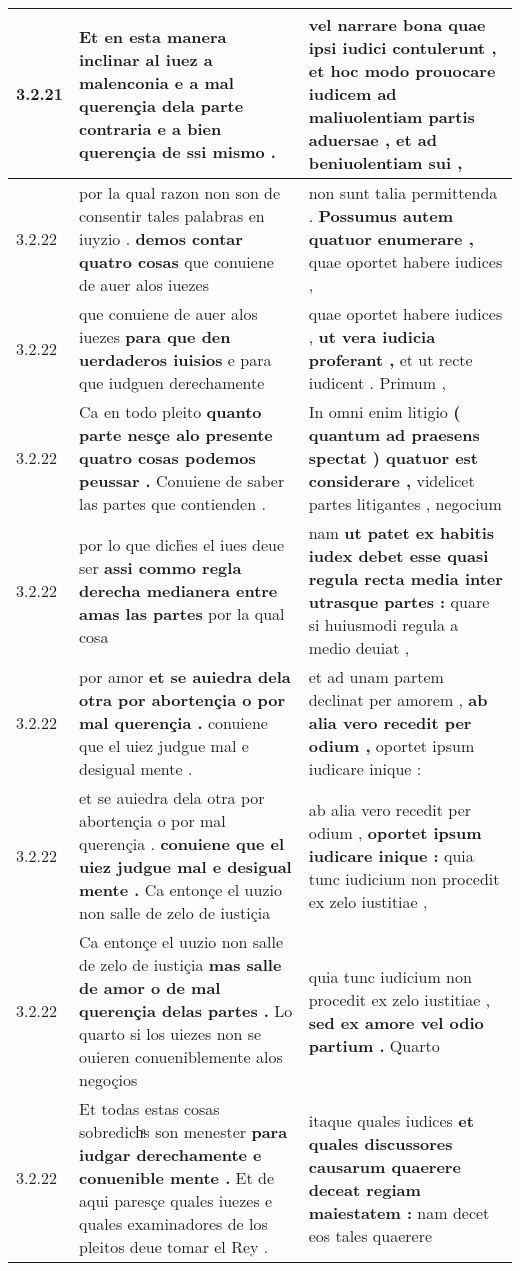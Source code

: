 \begin{tabular}{|p{1cm}|p{6.5cm}|p{6.5cm}|}
3.2.21 & Et en esta manera inclinar al iuez a malenconia \textbf{ e a mal querençia dela parte contraria } e a bien querençia de ssi mismo . & vel narrare bona quae ipsi iudici contulerunt , \textbf{ et hoc modo prouocare iudicem ad maliuolentiam partis aduersae , } et ad beniuolentiam sui , \\\hline
3.2.22 & por la qual razon non son de consentir tales palabras en iuyzio . \textbf{ demos contar quatro cosas } que conuiene de auer alos iuezes & non sunt talia permittenda . \textbf{ Possumus autem quatuor enumerare , } quae oportet habere iudices , \\\hline
3.2.22 & que conuiene de auer alos iuezes \textbf{ para que den uerdaderos iuisios } e para que iudguen derechamente & quae oportet habere iudices , \textbf{ ut vera iudicia proferant , } et ut recte iudicent . Primum , \\\hline
3.2.22 & Ca en todo pleito \textbf{ quanto parte nesçe alo presente quatro cosas podemos peussar . } Conuiene de saber las partes que contienden . & In omni enim litigio \textbf{ ( quantum ad praesens spectat ) quatuor est considerare , } videlicet partes litigantes , negocium \\\hline
3.2.22 & por lo que dich̉es el iues deue ser \textbf{ assi commo regla derecha medianera entre amas las partes } por la qual cosa & nam \textbf{ ut patet ex habitis iudex debet esse quasi regula recta media inter utrasque partes : } quare si huiusmodi regula a medio deuiat , \\\hline
3.2.22 & por amor \textbf{ et se auiedra dela otra por abortençia o por mal querençia . } conuiene que el uiez judgue mal e desigual mente . & et ad unam partem declinat per amorem , \textbf{ ab alia vero recedit per odium , } oportet ipsum iudicare inique : \\\hline
3.2.22 & et se auiedra dela otra por abortençia o por mal querençia . \textbf{ conuiene que el uiez judgue mal e desigual mente . } Ca entonçe el uuzio non salle de zelo de iustiçia & ab alia vero recedit per odium , \textbf{ oportet ipsum iudicare inique : } quia tunc iudicium non procedit ex zelo iustitiae , \\\hline
3.2.22 & Ca entonçe el uuzio non salle de zelo de iustiçia \textbf{ mas salle de amor o de mal querençia delas partes . } Lo quarto si los uiezes non se ouieren conueniblemente alos negoçios & quia tunc iudicium non procedit ex zelo iustitiae , \textbf{ sed ex amore vel odio partium . } Quarto \\\hline
3.2.22 & Et todas estas cosas sobredichͣs son menester \textbf{ para iudgar derechamente e conuenible mente . } Et de aqui paresçe quales iuezes e quales examinadores de los pleitos deue tomar el Rey . & itaque quales iudices \textbf{ et quales discussores causarum quaerere deceat regiam maiestatem : } nam decet eos tales quaerere \\\hline

\end{tabular}
